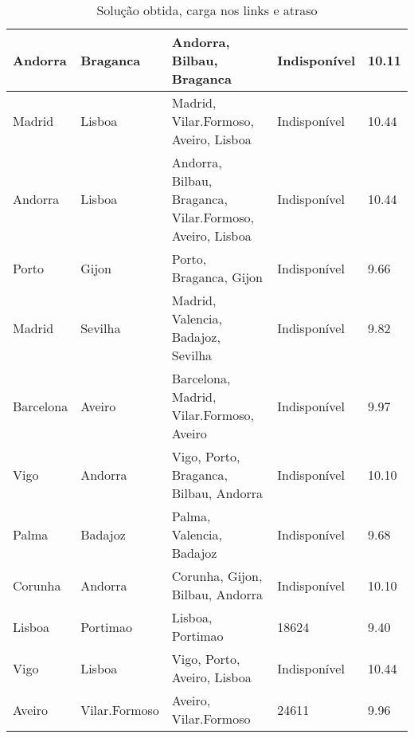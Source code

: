 \begin{table}[!htb]
{\begin{tabular}{|l|l|l|l|l|}
Andorra & Braganca & Andorra, Bilbau, Braganca & Indisponível & 10.11 \\ \hline
Madrid & Lisboa & Madrid, Vilar.Formoso, Aveiro, Lisboa & Indisponível & 10.44 \\ \hline
Andorra & Lisboa & Andorra, Bilbau, Braganca, Vilar.Formoso, Aveiro, Lisboa & Indisponível & 10.44 \\ \hline
Porto & Gijon & Porto, Braganca, Gijon & Indisponível & 9.66 \\ \hline
Madrid & Sevilha & Madrid, Valencia, Badajoz, Sevilha & Indisponível & 9.82 \\ \hline
Barcelona & Aveiro & Barcelona, Madrid, Vilar.Formoso, Aveiro & Indisponível & 9.97 \\ \hline
Vigo & Andorra & Vigo, Porto, Braganca, Bilbau, Andorra & Indisponível & 10.10 \\ \hline
Palma & Badajoz & Palma, Valencia, Badajoz & Indisponível & 9.68 \\ \hline
Corunha & Andorra & Corunha, Gijon, Bilbau, Andorra & Indisponível & 10.10 \\ \hline
Lisboa & Portimao & Lisboa, Portimao & 18624 & 9.40 \\ \hline
Vigo & Lisboa & Vigo, Porto, Aveiro, Lisboa & Indisponível & 10.44 \\ \hline
Aveiro & Vilar.Formoso & Aveiro, Vilar.Formoso & 24611 & 9.96 \\ \hline
\end{tabular}}
\caption[]{Solução obtida, carga nos links e atraso}
\end{table}

